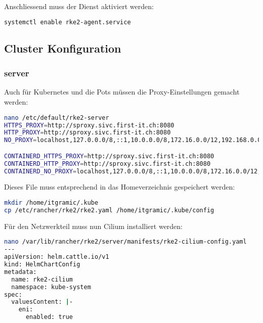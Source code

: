 Anschliessend muss der Dienst aktiviert werden:
\lstset{style=gra_codestyle}
\begin{lstlisting}[language=bash, caption=rke2 agent aktivieren,captionpos=b,label={lst:rke2-agent-enable},breaklines=true]
systemctl enable rke2-agent.service
\end{lstlisting}

\subsection{Cluster Konfiguration}
\subsubsection{server}
Auch für Kubernetes und die Pots müssen die Proxy-Einstellungen gemacht werden:
\lstset{style=gra_codestyle}
\begin{lstlisting}[language=bash, caption=rke2 server proxy,captionpos=b,label={lst:rke2-server-proxy},breaklines=true]
nano /etc/default/rke2-server
HTTPS_PROXY=http://sproxy.sivc.first-it.ch:8080
HTTP_PROXY=http://sproxy.sivc.first-it.ch:8080
NO_PROXY=localhost,127.0.0.0/8,::1,10.0.0.0/8,172.16.0.0/12,192.168.0.0/16

CONTAINERD_HTTPS_PROXY=http://sproxy.sivc.first-it.ch:8080
CONTAINERD_HTTP_PROXY=http://sproxy.sivc.first-it.ch:8080
CONTAINERD_NO_PROXY=localhost,127.0.0.0/8,::1,10.0.0.0/8,172.16.0.0/12,192.168.0.0/16
\end{lstlisting}

Dieses File muss entsprechend in das Homeverzeichnis gespeichert werden:
\lstset{style=gra_codestyle}
\begin{lstlisting}[language=bash, caption=rke2 server proxy kopieren,captionpos=b,label={lst:rke2-server-proxy-copy},breaklines=true]
mkdir /home/itgramic/.kube
cp /etc/rancher/rke2/rke2.yaml /home/itgramic/.kube/config
\end{lstlisting}

Für den Netzwerkteil muss nun Cilium installiert werden:
\lstset{style=gra_codestyle}
\begin{lstlisting}[language=bash, caption=rke2 server cilium installieren,captionpos=b,label={lst:rke2-server-cilium-install},breaklines=true]
nano /var/lib/rancher/rke2/server/manifests/rke2-cilium-config.yaml
---
apiVersion: helm.cattle.io/v1
kind: HelmChartConfig
metadata:
  name: rke2-cilium
  namespace: kube-system
spec:
  valuesContent: |-
    eni:
      enabled: true

\end{lstlisting}

